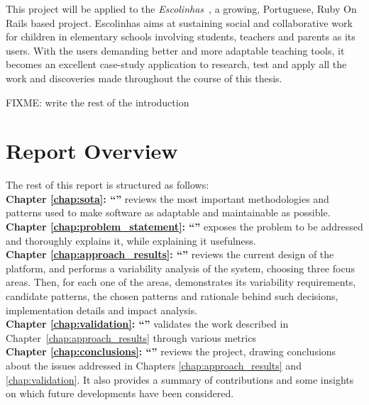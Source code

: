 This project will be applied to the \textit{Escolinhas}~\cite{escolinhas}, a growing, Portuguese, Ruby On Rails based project. Escolinhas aims at sustaining social and collaborative work for children in elementary schools involving students, teachers and parents as its users. With the users demanding better and more adaptable teaching tools, it becomes an excellent case-study application to research, test and apply all the work and discoveries made throughout the course of this thesis.

FIXME: write the rest of the introduction

\section{Report Overview}\label{sec:structure}

The rest of this report is structured as follows:\\

\textbf{Chapter \ref{chap:sota}: ``'' } reviews the most important methodologies and patterns used to make software as adaptable and maintainable as possible.\\

\textbf{Chapter \ref{chap:problem_statement}: ``'' } exposes the problem to be addressed and thoroughly explains it, while explaining it usefulness.\\

\textbf{Chapter \ref{chap:approach_results}: ``'' } reviews the current design of the platform, and performs a variability analysis of the system, choosing three focus areas. Then, for each one of the areas, demonstrates its variability requirements, candidate patterns, the chosen patterns and rationale behind such decisions, implementation details and impact analysis.\\

\textbf{Chapter \ref{chap:validation}: ``'' } validates the work described in Chapter~\ref{chap:approach_results} through various metrics\\ %

\textbf{Chapter \ref{chap:conclusions}: ``'' } reviews the project, drawing conclusions about the issues addressed in Chapters \ref{chap:approach_results} and \ref{chap:validation}. It also provides a summary of contributions and some insights on which future developments have been considered.\\

